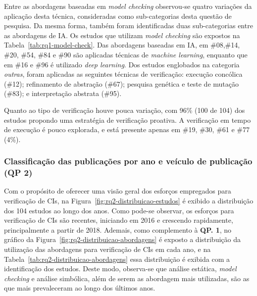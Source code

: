 

Entre as abordagens baseadas em \textit{model checking} observou-se quatro variações da aplicação desta técnica, consideradas como sub-categorias desta questão de pesquisa. Da mesma forma, também foram identificadas duas sub-categorias entre as abordagens de IA. Os estudos que utilizam \textit{model checking} são expostos na Tabela~\ref{tab:rq1-model-check}. Das abordagens baseadas em IA, em \#08,\#14, \#20, \#54, \#84 e \#90 são aplicadas técnicas de \textit{machine learning}, enquanto que em \#16 e \#96 é utilizado \textit{deep learning}. Dos estudos englobados na categoria \textit{outras}, foram aplicadas as seguintes técnicas de verificação: execução concólica (\#12); refinamento de abstração (\#67); pesquisa genética e teste de mutação (\#83); e interpretação abstrata (\#95).

Quanto ao tipo de verificação houve pouca variação, com 96\% (100 de 104) dos estudos propondo uma estratégia de verificação proativa. A verificação em tempo de execução é pouco explorada, e está presente apenas em \#19, \#30, \#61 e \#77 (4\%). 




\subsubsection*{\textbf{Classificação das publicações por ano e veículo de publicação (QP 2)}}

Com o propósito de oferecer uma visão geral dos esforços empregados para verificação de CIs, na Figura~\ref{fig:rq2-distribuicao-estudos} é exibido a distribuição dos 104 estudos ao longo dos anos. Como pode-se observar, os esforços para verificação de CIs são recentes, iniciando em 2016 e crescendo rapidamente, principalmente a partir de 2018. Ademais, como complemento à \textbf{QP. 1}, no gráfico da Figura~\ref{fig:rq2-distribuicao-abordagens} é exposto a distribuição da utilização das abordagens para verificação de CIs em cada ano, e na Tabela~\ref{tab:rq2-distribuicao-abordagens} essa distribuição é exibida com a identificação dos estudos. Deste modo, observa-se que análise estática, \textit{model checking} e análise simbólica, além de serem as abordagem mais utilizadas, são as que mais prevaleceram ao longo dos últimos anos. 


